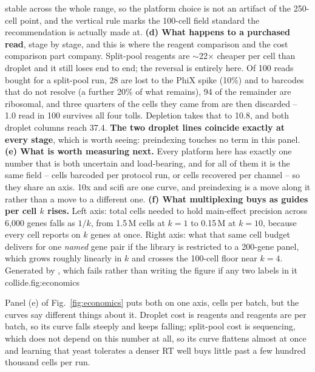 {  stable across the whole range, so the platform choice is not an artifact of the
  250-cell point, and the vertical rule marks the 100-cell field standard the
  recommendation is actually made at.
  \textbf{(d) What happens to a purchased read}, stage by stage, and this is
  where the reagent comparison and the cost comparison part company. Split-pool
  reagents are $\sim$22$\times$ cheaper per cell than droplet and it still loses
  end to end; the reversal is entirely here. Of 100 reads bought for a split-pool
  run, 28 are lost to the PhiX spike (10\%) and to barcodes that do not resolve
  (a further 20\% of what remains), 94 of the remainder are ribosomal, and three
  quarters of the cells they came from are then discarded -- 1.0 read in 100
  survives all four tolls. Depletion takes that to 10.8, and both
  droplet columns reach 37.4. \textbf{The two droplet lines coincide exactly at
  every stage}, which is worth seeing: preindexing touches no term in this panel.
  \textbf{(e) What is worth measuring next.} Every platform here has exactly one
  number that is both uncertain and load-bearing, and for all of them it is the
  same field -- cells barcoded per protocol run, or cells recovered per channel --
  so they share an axis. 10x and
  scifi are one curve, and preindexing is a move along it rather than a move to a
  different one.
  \textbf{(f) What multiplexing buys as guides per cell $k$ rises.} Left axis:
  total cells needed to hold main-effect precision across 6{,}000 genes falls as
  $1/k$, from 1.5\,M cells at $k=1$ to 0.15\,M at $k=10$, because every cell
  reports on $k$ genes at once. Right axis: what that same cell budget delivers
  for one \emph{named} gene pair if the library is restricted to a 200-gene panel,
  which grows roughly linearly in $k$ and crosses the 100-cell floor near $k=4$.
  Generated by
  , which
  fails rather than writing the figure if any two labels in it collide.}{fig:economics}

 Panel (e) of
Fig.~\ref{fig:economics} puts both on one axis, cells per batch, but the curves
say different things about it. Droplet cost is reagents and reagents are per
batch, so its curve falls steeply and keeps falling; split-pool cost is
sequencing, which does not depend on this number at all, so its curve flattens
almost at once and learning that yeast tolerates a denser RT well buys little
past a few hundred thousand cells per run.

